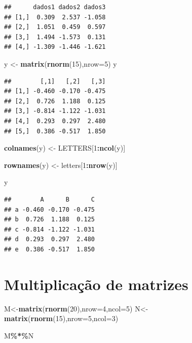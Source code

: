 \documentclass[
]{book}
\newenvironment{Shaded}{\begin{snugshade}}{\end{snugshade}}
\newcommand{\AttributeTok}[1]{\textcolor[rgb]{0.13,0.29,0.53}{#1}}
\newcommand{\DecValTok}[1]{\textcolor[rgb]{0.00,0.00,0.81}{#1}}
\newcommand{\FunctionTok}[1]{\textcolor[rgb]{0.13,0.29,0.53}{\textbf{#1}}}
\newcommand{\NormalTok}[1]{#1}
\newcommand{\OtherTok}[1]{\textcolor[rgb]{0.56,0.35,0.01}{#1}}
\newcommand{\SpecialCharTok}[1]{\textcolor[rgb]{0.81,0.36,0.00}{\textbf{#1}}}
\theoremstyle{definition}
\theoremstyle{definition}
\theoremstyle{definition}
\theoremstyle{definition}
\theoremstyle{remark}
\begin{document}
\begin{verbatim}
##      dados1 dados2 dados3
## [1,]  0.309  2.537 -1.058
## [2,]  1.051  0.459  0.597
## [3,]  1.494 -1.573  0.131
## [4,] -1.309 -1.446 -1.621
\end{verbatim}

\begin{Shaded}
\begin{Highlighting}[]
\NormalTok{y }\OtherTok{\textless{}{-}} \FunctionTok{matrix}\NormalTok{(}\FunctionTok{rnorm}\NormalTok{(}\DecValTok{15}\NormalTok{),}\AttributeTok{nrow=}\DecValTok{5}\NormalTok{)}
\NormalTok{y }
\end{Highlighting}
\end{Shaded}

\begin{verbatim}
##        [,1]   [,2]   [,3]
## [1,] -0.460 -0.170 -0.475
## [2,]  0.726  1.188  0.125
## [3,] -0.814 -1.122 -1.031
## [4,]  0.293  0.297  2.480
## [5,]  0.386 -0.517  1.850
\end{verbatim}

\begin{Shaded}
\begin{Highlighting}[]
\FunctionTok{colnames}\NormalTok{(y) }\OtherTok{\textless{}{-}}\NormalTok{ LETTERS[}\DecValTok{1}\SpecialCharTok{:}\FunctionTok{ncol}\NormalTok{(y)]}

\FunctionTok{rownames}\NormalTok{(y) }\OtherTok{\textless{}{-}}\NormalTok{ letters[}\DecValTok{1}\SpecialCharTok{:}\FunctionTok{nrow}\NormalTok{(y)]}

\NormalTok{y}
\end{Highlighting}
\end{Shaded}

\begin{verbatim}
##        A      B      C
## a -0.460 -0.170 -0.475
## b  0.726  1.188  0.125
## c -0.814 -1.122 -1.031
## d  0.293  0.297  2.480
## e  0.386 -0.517  1.850
\end{verbatim}

\section{Multiplicação de matrizes}\label{multiplicauxe7uxe3o-de-matrizes}

\begin{Shaded}
\begin{Highlighting}[]
\NormalTok{M}\OtherTok{\textless{}{-}}\FunctionTok{matrix}\NormalTok{(}\FunctionTok{rnorm}\NormalTok{(}\DecValTok{20}\NormalTok{),}\AttributeTok{nrow=}\DecValTok{4}\NormalTok{,}\AttributeTok{ncol=}\DecValTok{5}\NormalTok{)}
\NormalTok{N}\OtherTok{\textless{}{-}}\FunctionTok{matrix}\NormalTok{(}\FunctionTok{rnorm}\NormalTok{(}\DecValTok{15}\NormalTok{),}\AttributeTok{nrow=}\DecValTok{5}\NormalTok{,}\AttributeTok{ncol=}\DecValTok{3}\NormalTok{)}

\NormalTok{M}\SpecialCharTok{\%*\%}\NormalTok{N}
\end{Highlighting}
\end{Shaded}
\end{document}
